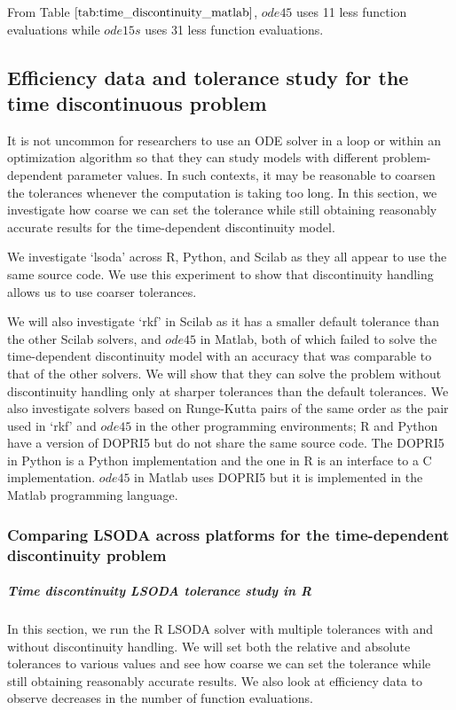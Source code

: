 From Table $\ref{tab:time_discontinuity_matlab}$, $ode45$ uses 11 less function evaluations while $ode15s$ uses 31 less function evaluations.

\subsection{Efficiency data and tolerance study for the time discontinuous problem}
\label{subsection:time_tolerance_study}
It is not uncommon for researchers to use an ODE solver in a loop or within an optimization algorithm so that they can study models with different problem-dependent parameter values. In such contexts, it may be reasonable to coarsen the tolerances whenever the computation is taking too long. In this section, we investigate how coarse we can set the tolerance while still obtaining reasonably accurate results for the time-dependent discontinuity model. 

We investigate `lsoda' across R, Python, and Scilab as they all appear to use the same source code. We use this experiment to show that discontinuity handling allows us to use coarser tolerances.

We will also investigate `rkf' in Scilab as it has a smaller default tolerance than the other Scilab solvers, and $ode45$ in Matlab, both of which failed to solve the time-dependent discontinuity model with an accuracy that was comparable to that of the other solvers. We will show that they can solve the problem without discontinuity handling only at sharper tolerances than the default tolerances. We also investigate solvers based on Runge-Kutta pairs of the same order as the pair used in `rkf' and $ode45$ in the other programming environments; R and Python have a version of DOPRI5 but do not share the same source code. The DOPRI5 in Python is a Python implementation and the one in R is an interface to a C implementation. $ode45$ in Matlab uses DOPRI5 but it is implemented in the Matlab programming language.

\subsubsection{Comparing LSODA across platforms for the time-dependent discontinuity problem}
\subparagraph{Time discontinuity LSODA tolerance study in R}
In this section, we run the R LSODA solver with multiple tolerances with and without discontinuity handling. We will set both the relative and absolute tolerances to various values and see how coarse we can set the tolerance while still obtaining reasonably accurate results. We also look at efficiency data to observe decreases in the number of function evaluations.

